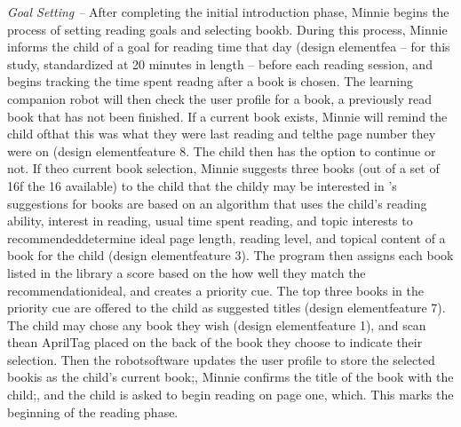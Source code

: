 \documentclass{sigchi}
\begin{document}
\textit{Goal Setting --} After completing the initial introduction phase, Minnie begins the process of setting reading goals and selecting bookb. During this process, Minnie informs the child of a goal for reading time that day (design elementfea -- for this study, standardized at 20 minutes in length -- before each reading session, and begins tracking the time spent readng after a book is chosen. The learning companion robot will then check the user profile for a book, a previously read book that has not been finished. If a current book exists, Minnie will remind the child ofthat this was what they were last reading and telthe page number they were on (design elementfeature 8. The child then has the option to continue or not. If theo current book selection, Minnie suggests three books (out of a set of 16f the 16 available) to the child that the childy may be interested in                                    's suggestions for books are based on an algorithm that uses the child's reading ability, interest in reading, usual time spent reading, and topic interests to recommendeddetermine ideal page length, reading level, and topical content of a book for the child (design elementfeature 3). The program then assigns each book listed in the library a score based on the how well they match the recommendationideal, and creates a priority cue. The top three books in the priority cue are offered to the child as suggested titles (design elementfeature 7). The child may chose any book they wish (design elementfeature 1), and scan thean AprilTag placed on the back of the book they choose to indicate their selection. Then the robotsoftware updates the user profile to store the selected bookis as the child's current book;, Minnie confirms the title of the book with the child;, and the child is asked to begin reading on page one, which. This marks the beginning of the reading phase.
\end{document}
